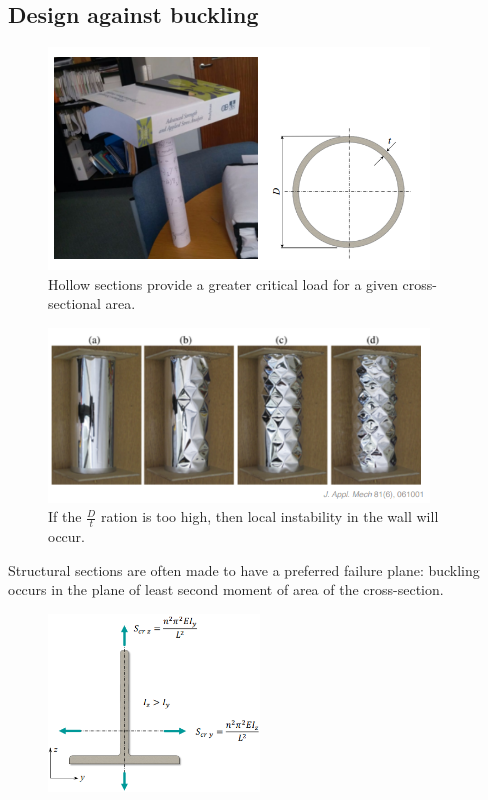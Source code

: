 \documentclass[class=report, crop=false, 12pt,a4paper]{standalone}
\begin{document}
\subsection{Design against buckling}
\begin{figure}[H]
    \centering
    \includegraphics[width = 0.9\textwidth]{../img/diagram34.png}
    \caption{Hollow sections provide a greater critical load for a given cross-sectional area.}
\end{figure}
\begin{figure}[H]
    \centering
    \includegraphics[width = 0.9\textwidth]{../img/diagram35.png}
    \caption{If the $\frac{D}{t}$ ration is too high, then local instability in the wall will occur.}
\end{figure}
Structural sections are often made to have a preferred failure plane: buckling occurs in the plane of least second moment of area of the cross-section. 
\begin{figure}[H]
    \centering
    \includegraphics[width = 0.5\textwidth]{../img/diagram36.png}
    \caption{}
\end{figure}
\end{document}
